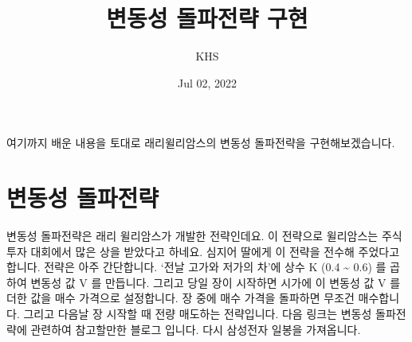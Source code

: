 \documentclass[letterpaper,10pt,english]{jupyterBook}
\title{변동성 돌파전략 구현}
\date{Jul 02, 2022}
\author{KHS}
\begin{document}
\pagestyle{empty}
\sphinxmaketitle
\pagestyle{plain}
\sphinxtableofcontents
\pagestyle{normal}
\label{\detokenize{chapter2/2.4.1_Volatility_Breakout::doc}}


\sphinxAtStartPar
여기까지 배운 내용을 토대로 래리윌리암스의 변동성 돌파전략을 구현해보겠습니다.


\part{변동성 돌파전략}
\label{\detokenize{chapter2/2.4.1_Volatility_Breakout:id2}}
\sphinxAtStartPar
변동성 돌파전략은 래리 윌리암스가 개발한 전략인데요. 이 전략으로 윌리암스는 주식투자 대회에서 많은 상을 받았다고 하네요. 심지어 딸에게 이 전략을 전수해 주었다고 합니다. 전략은 아주 간단합니다. ‘전날 고가와 저가의 차’에 상수 K (0.4 \textasciitilde{} 0.6) 를 곱하여 변동성 값 V 를 만듭니다. 그리고 당일 장이 시작하면 시가에 이 변동성 값 V 를 더한 값을 매수 가격으로 설정합니다. 장 중에 매수 가격을 돌파하면 무조건 매수합니다. 그리고 다음날 장 시작할 때 전량 매도하는 전략입니다. 다음 링크는 변동성 돌파전략에 관련하여 참고할만한 블로그 입니다.  다시 삼성전자 일봉을 가져옵니다.
\end{document}
